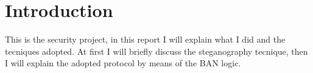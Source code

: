 \chapter*{Introduction}

This is the security project, in this report I will explain what I did and the tecniques adopted.
At first I will briefly discuss the steganography tecnique, then I will explain the adopted protocol by means of the BAN logic. 